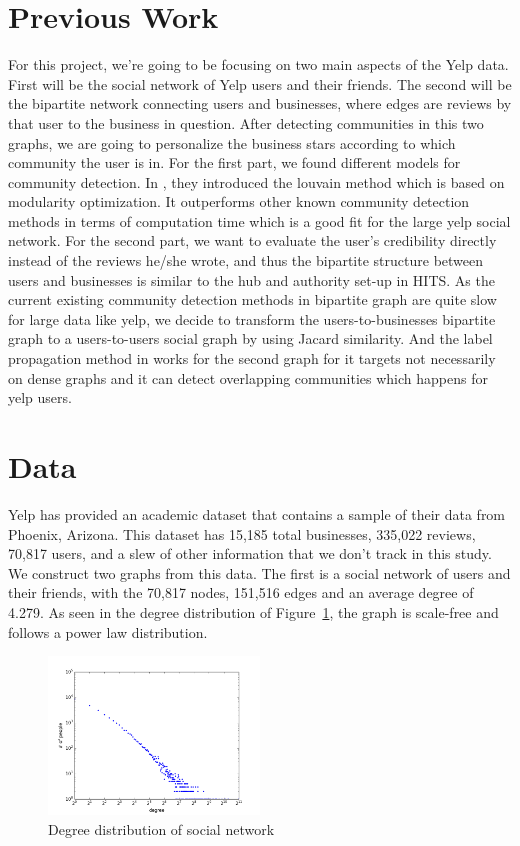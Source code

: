 \documentclass[10pt]{article}
\begin{document}
\section{Previous Work}

For this project, we're going to be focusing on two main aspects of the Yelp data. First will be
the social network of Yelp users and their friends. The second will be the bipartite network
connecting users and businesses, where edges are reviews by that user to the business
in question. After detecting communities in this two graphs, we are going to personalize
the business stars according to which community the user is in. For the first part, we found different models
for community detection. In \cite{blondel2008fast}, they introduced the louvain method which is based on modularity optimization. It outperforms other known community detection methods in terms of computation time which is a good fit for the large yelp social network. 
For the second part, we want to evaluate the user's credibility directly instead of the reviews he/she wrote, and thus the bipartite structure between users and businesses is similar to the hub and authority set-up in HITS\cite{newman2004finding}. As the current existing community detection methods in bipartite graph are quite slow for large data like yelp, we decide to transform the users-to-businesses bipartite graph to a  users-to-users social graph by using Jacard similarity. And the label propagation method in \cite{gregory2010finding} works for the second graph for it targets not necessarily on dense graphs and it can detect overlapping communities which happens for yelp users.  

\section{Data}

Yelp has provided an academic dataset that contains a sample of their data from Phoenix, Arizona.  This dataset has 15,185 total businesses, 335,022 reviews, 70,817 users, and a slew of other information that we don't track in this study.  We construct two graphs from this data.  The first is a social network of users and their friends, with the 70,817 nodes, 151,516 edges and an average degree of 4.279.  As seen in the degree distribution of Figure~\ref{fig:social_degree}, the graph is scale-free and follows a power law distribution.

\begin{figure}[ht]
  \centering
    \includegraphics[width=0.5\textwidth]{soc_degree_distribution.png}
  \caption{Degree distribution of social network}
  \label{fig:social_degree}
\end{figure}
\end{document}

